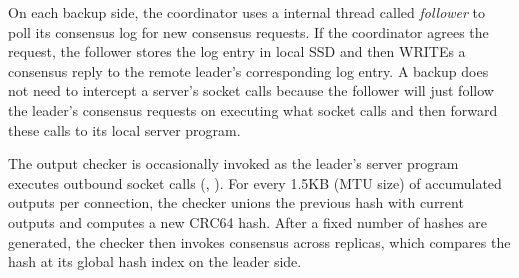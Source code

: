 

On each backup side, the coordinator uses a \xxx internal thread called 
\emph{follower} to poll its consensus log for new consensus requests. If the 
coordinator agrees the request, the follower stores the log entry in local SSD 
and then WRITEs a consensus reply to the remote leader's corresponding log 
entry. A backup does not need to intercept a server's socket calls because the 
follower will just follow the leader's consensus requests on executing what 
socket calls and then forward these calls to its local server program.




The output checker is occasionally invoked as the leader's server program 
executes outbound socket calls (\eg, \send). For every 1.5KB (MTU size) of 
accumulated outputs per connection, the checker unions the previous hash with 
current outputs and computes a new CRC64 hash. After a fixed number of hashes 
are generated, the checker then invokes consensus across replicas, which 
compares the hash at its global hash index on the leader side.

